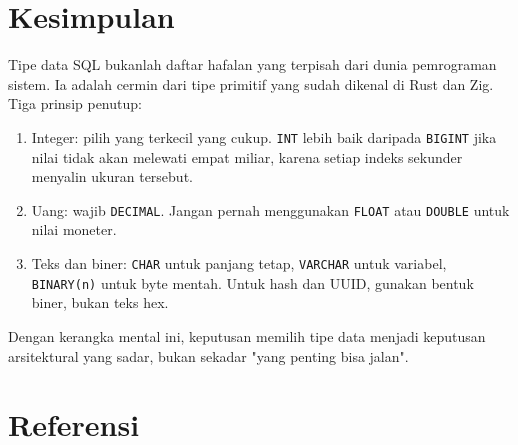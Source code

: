 \documentclass[11pt,a4paper]{article}
\begin{document}
\section{Kesimpulan}

Tipe data SQL bukanlah daftar hafalan yang terpisah dari dunia pemrograman sistem. Ia adalah cermin dari tipe primitif yang sudah dikenal di Rust dan Zig. Tiga prinsip penutup:

\begin{enumerate}
	\item Integer: pilih yang terkecil yang cukup. \texttt{INT} lebih baik daripada \texttt{BIGINT} jika nilai tidak akan melewati empat miliar, karena setiap indeks sekunder menyalin ukuran tersebut.
	\item Uang: wajib \texttt{DECIMAL}. Jangan pernah menggunakan \texttt{FLOAT} atau \texttt{DOUBLE} untuk nilai moneter.
	\item Teks dan biner: \texttt{CHAR} untuk panjang tetap, \texttt{VARCHAR} untuk variabel, \texttt{BINARY(n)} untuk byte mentah. Untuk hash dan UUID, gunakan bentuk biner, bukan teks hex.
\end{enumerate}

Dengan kerangka mental ini, keputusan memilih tipe data menjadi keputusan arsitektural yang sadar, bukan sekadar "yang penting bisa jalan".

\newpage
\section*{Referensi}
\end{document}
